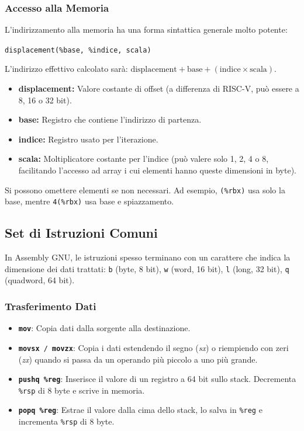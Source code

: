 \documentclass[12pt, a4paper]{article}
\begin{document}
\subsubsection{Accesso alla Memoria}
L'indirizzamento alla memoria ha una forma sintattica generale molto potente:
\begin{center}
    \texttt{displacement(\%base, \%indice, scala)}
\end{center}
L'indirizzo effettivo calcolato sarà: $\text{displacement} + \text{base} + (\text{indice} \times \text{scala})$.
\begin{itemize}
    \item \textbf{displacement:} Valore costante di offset (a differenza di RISC-V, può essere a 8, 16 o 32 bit).
    \item \textbf{base:} Registro che contiene l'indirizzo di partenza.
    \item \textbf{indice:} Registro usato per l'iterazione.
    \item \textbf{scala:} Moltiplicatore costante per l'indice (può valere solo 1, 2, 4 o 8, facilitando l'accesso ad array i cui elementi hanno queste dimensioni in byte).
\end{itemize}
Si possono omettere elementi se non necessari. Ad esempio, \texttt{(\%rbx)} usa solo la base, mentre \texttt{4(\%rbx)} usa base e spiazzamento.

\subsection{Set di Istruzioni Comuni}
In Assembly GNU, le istruzioni spesso terminano con un carattere che indica la dimensione dei dati trattati: \texttt{b} (byte, 8 bit), \texttt{w} (word, 16 bit), \texttt{l} (long, 32 bit), \texttt{q} (quadword, 64 bit).

\subsubsection{Trasferimento Dati}
\begin{itemize}
    \item \texttt{\textbf{mov}}: Copia dati dalla sorgente alla destinazione.
    \item \texttt{\textbf{movsx} / \textbf{movzx}}: Copia i dati estendendo il segno (\textit{sx}) o riempiendo con zeri (\textit{zx}) quando si passa da un operando più piccolo a uno più grande.
    \item \texttt{\textbf{pushq \%reg}}: Inserisce il valore di un registro a 64 bit sullo stack. Decrementa \texttt{\%rsp} di 8 byte e scrive in memoria.
    \item \texttt{\textbf{popq \%reg}}: Estrae il valore dalla cima dello stack, lo salva in \texttt{\%reg} e incrementa \texttt{\%rsp} di 8 byte.
\end{itemize}
\end{document}
